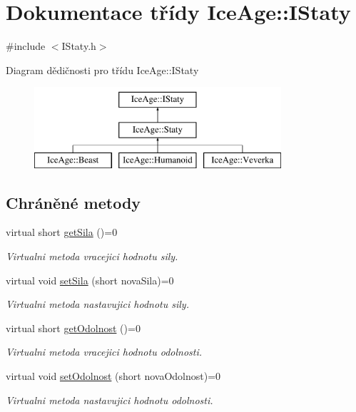 \hypertarget{classIceAge_1_1IStaty}{}\section{Dokumentace třídy Ice\+Age\+:\+:I\+Staty}
\label{classIceAge_1_1IStaty}


{\ttfamily \#include $<$I\+Staty.\+h$>$}

Diagram dědičnosti pro třídu Ice\+Age\+:\+:I\+Staty\begin{figure}[H]
\begin{center}
\leavevmode
\includegraphics[height=3.000000cm]{d7/ddc/classIceAge_1_1IStaty}
\end{center}
\end{figure}
\subsection*{Chráněné metody}
\begin{DoxyCompactItemize}
\item 
virtual short \hyperlink{classIceAge_1_1IStaty_a2cacca9736cd47f6f880a7ea11750fdc}{get\+Sila} ()=0
\begin{DoxyCompactList}\small\item\em Virtualni metoda vracejici hodnotu sily. \end{DoxyCompactList}\item 
virtual void \hyperlink{classIceAge_1_1IStaty_aa1c9b32a5fe0164dc4a04fc19b087742}{set\+Sila} (short nova\+Sila)=0
\begin{DoxyCompactList}\small\item\em Virtualni metoda nastavujici hodnotu sily. \end{DoxyCompactList}\item 
virtual short \hyperlink{classIceAge_1_1IStaty_ac6644714a0dec5e4de2322e338e4495a}{get\+Odolnost} ()=0
\begin{DoxyCompactList}\small\item\em Virtualni metoda vracejici hodnotu odolnosti. \end{DoxyCompactList}\item 
virtual void \hyperlink{classIceAge_1_1IStaty_addca8d4cc252281aac841ec60da588fd}{set\+Odolnost} (short nova\+Odolnost)=0
\begin{DoxyCompactList}\small\item\em Virtualni metoda nastavujici hodnotu odolnosti. \end{DoxyCompactList}\end{DoxyCompactItemize}


